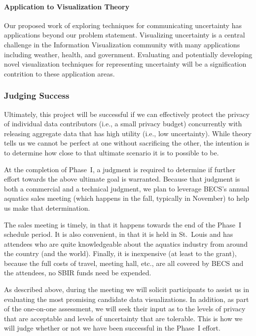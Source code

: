\paragraph{Application to Visualization Theory} 
Our proposed work of exploring techniques for communicating uncertainty has applications beyond our problem statement. Visualizing uncertainty is a central challenge in the Information Visualization community with many applications including weather, health, and government. Evaluating and potentially developing novel visualization techniques for representing uncertainty will be a signification contrition to these application areas.  


\subsubsection{Judging Success}

Ultimately, this project will be successful if we can effectively
protect the privacy of individual data contributors (i.e., a small
privacy budget) concurrently with releasing aggregate data that has
high utility (i.e., low uncertainty).  While theory tells us we cannot
be perfect at one without sacrificing the other, the intention
is to determine how close to that ultimate scenario it is to possible to be.

At the completion of Phase~I, a judgment is required to determine if
further effort towards the above ultimate goal is warranted.
Because that judgment is both a commercial and a technical judgment, we
plan to leverage BECS's annual aquatics sales meeting (which happens in
the fall, typically in November) to help us make that determination.

The sales meeting is timely, in that it happens towards the end of
the Phase~I schedule period.  It is also convenient, in that it is held
in St.~Louis and has attendees who are quite knowledgeable about 
the aquatics industry from around the country (and the world).
Finally, it is inexpensive (at least to the grant), because the full
costs of travel, meeting hall, etc., are all covered by BECS and
the attendees, no SBIR funds need be expended.

As described above, during the meeting we will solicit participants
to assist us in evaluating the most promising candidate data visualizations.
In addition, as part of the one-on-one assessment, we will seek their
input as to the levels of privacy that are acceptable and levels of 
uncertainty that are tolerable.
This is how we will judge whether or not we have been successful
in the Phase~I effort.

